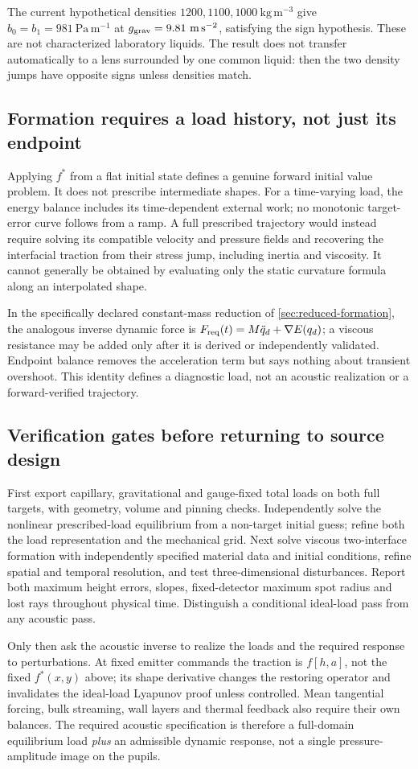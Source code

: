 The current hypothetical densities $1200,1100,1000\ \mathrm{kg\,m^{-3}}$
give $b_0=b_1=981\ \mathrm{Pa\,m^{-1}}$ at
$g_{\rm grav}=9.81\ \mathrm{m\,s^{-2}}$, satisfying the sign hypothesis.
These are not characterized laboratory liquids. The result does not transfer
automatically to a lens surrounded by one common liquid: then the two density
jumps have opposite signs unless densities match.

\subsection{Formation requires a load history, not just its endpoint}
Applying $f^*$ from a flat initial state defines a genuine forward initial
value problem. It does not prescribe intermediate shapes. For a time-varying
load, the energy balance includes its time-dependent external work; no
monotonic target-error curve follows from a ramp. A full prescribed trajectory
would instead require solving its compatible velocity and pressure fields
and recovering the interfacial traction from their stress jump, including
inertia and viscosity. It cannot generally be obtained by evaluating only
the static curvature formula along an interpolated shape.

In the specifically declared constant-mass reduction of
\cref{sec:reduced-formation}, the analogous inverse dynamic force is
$F_{\rm req}(t)=M\ddot q_d+\nabla E(q_d)$; a viscous resistance may be added
only after it is derived or independently validated. Endpoint balance removes
the acceleration term but says nothing about transient overshoot. This
identity defines a diagnostic load, not an acoustic realization or a
forward-verified trajectory.

\subsection{Verification gates before returning to source design}
First export capillary, gravitational and gauge-fixed total loads on both
full targets, with geometry, volume and pinning checks. Independently solve
the nonlinear prescribed-load equilibrium from a non-target initial guess;
refine both the load representation and the mechanical grid. Next solve
viscous two-interface formation with independently specified material data
and initial conditions, refine spatial and temporal resolution, and test
three-dimensional disturbances. Report both maximum height errors, slopes,
fixed-detector maximum spot radius and lost rays throughout physical time.
Distinguish a conditional ideal-load pass from any acoustic pass.

Only then ask the acoustic inverse to realize the loads and the required
response to perturbations. At fixed emitter commands the traction is
$f[h,a]$, not the fixed $f^*(x,y)$ above; its shape derivative changes the
restoring operator and invalidates the ideal-load Lyapunov proof unless
controlled. Mean tangential forcing, bulk streaming, wall layers and thermal
feedback also require their own balances. The required acoustic specification
is therefore a full-domain equilibrium load \emph{plus} an admissible dynamic
response, not a single pressure-amplitude image on the pupils.
